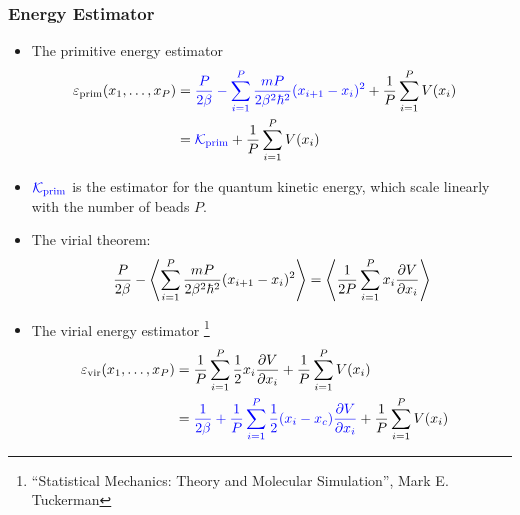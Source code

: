\begin{frame}
  \frametitle{Energy Estimator}

  \begin{itemize}
    \item
    The primitive energy estimator
    \begin{align*}
        \varepsilon_{\text{prim}}(x_1,\ldots,x_P) &=
                                        \mathcolor{blue}{
                                        {P\over2\beta} - \sum_{i=1}^P
                                        {mP\over2\beta^2\hbar^2} (x_{i+1} - x_i)^2}
                                        + {1\over P}\sum_{i=1}^P V(x_i) \cr
                                        &= \mathcolor{blue}{{\cal K}_{\text{prim}}} +
                                        {1\over P}\sum_{i=1}^P V(x_i)
    \end{align*}
    \item $\mathcolor{blue}{{\cal K}_{\text{prim}}}$ is the estimator for the
        quantum kinetic energy, which scale linearly with the number of beads $P$.
    \item The virial theorem:
        \begin{equation*}
        {P\over 2\beta} - \left\langle \sum_{i=1}^P {mP\over2\beta^2\hbar^2}
            (x_{i+1} - x_i)^2 \right\rangle = \left\langle {1\over 2P} \sum_{i=1}^P
            x_i {\partial V\over\partial x_i} \right\rangle
        \end{equation*}

    \item The virial energy estimator
    \footnote{
    ``Statistical Mechanics: Theory and Molecular Simulation'', Mark E. Tuckerman 
    }
        \begin{align*}
        \varepsilon_{\text{vir}}(x_1,\ldots,x_P) &= {1\over P} \sum_{i=1}^P {1\over 2} x_i
                                   {\partial V\over\partial x_i} + {1\over P} \sum_{i=1}^P V(x_i) \cr
          &= \mathcolor{blue}{
            {1\over2\beta} + {1\over P} \sum_{i=1}^P
            {1\over 2} (x_i - x_c) {\partial V\over\partial x_i}}
            + {1\over P} \sum_{i=1}^P V(x_i)
        \end{align*}
  \end{itemize}
\end{frame}